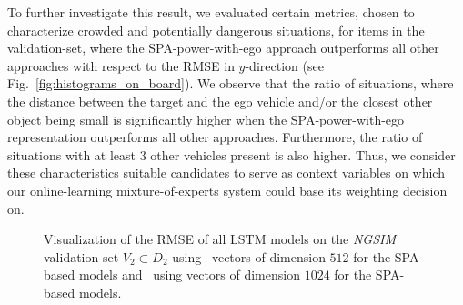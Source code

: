 To further investigate this result, we evaluated certain metrics, chosen to characterize crowded and potentially dangerous situations, for items in the validation-set, where the \ac{SPA}-power-with-ego approach outperforms all other approaches with respect to the \ac{RMSE} in $y$-direction (see Fig.~\ref{fig:histograms_on_board}).
We observe that the ratio of situations, where the distance between the target and the ego vehicle and/or the closest other object being small is significantly higher when the \ac{SPA}-power-with-ego representation outperforms all other approaches.
Furthermore, the ratio of situations with at least \num{3} other vehicles present is also higher.
Thus, we consider these characteristics suitable candidates to serve as context variables on which our online-learning mixture-of-experts system could base its weighting decision on.
\begin{figure}[t!]
	\centering
    \vspace{-0.3cm}

    \caption{Visualization of the \ac{RMSE} of all \ac{LSTM} models on the \emph{\ac{NGSIM}} validation set $V_2 \subset D_2$ using~\protect{} vectors of dimension $512$ for the \ac{SPA}-based models and~\protect{} using vectors of dimension $1024$ for the \ac{SPA}-based models.}\label{fig:rmse_ngsim_all}

\end{figure}


